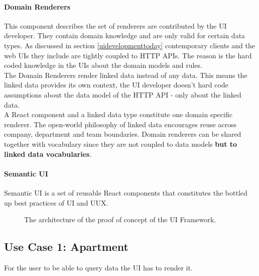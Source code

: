 \paragraph{Domain Renderers}
This component describes the set of renderers are contributed by the UI developer. They contain domain knowledge and are only valid for certain data types. As discussed in section \ref{uidevelopmenttoday} contemporary clients and the web UIs they include are tightly coupled to HTTP APIs. The reason is the hard coded knowledge in the UIs about the domain models and rules. \\
The Domain Renderers render linked data instead of any data. This means the linked data provides its own context, the UI developer doesn't hard code assumptions about the data model of the HTTP API - only about the linked data. \\
A React component and a linked data type constitute one domain specific renderer. The open-world philosophy of linked data encourages reuse across company, department and team boundaries. Domain renderers can be shared together with vocabulary since they are not coupled to data models \textbf{but to linked data vocabularies}.

\paragraph{Semantic UI}
Semantic UI is a set of reusable React components that constitutes the bottled up best practices of UI and UUX.

\begin{figure}[!htb]
  \caption{The architecture of the proof of concept of the UI Framework.}
\end{figure}

\subsection{Use Case 1: Apartment}\label{sec:usecase1}
For the user to be able to query data the UI has to render it.

